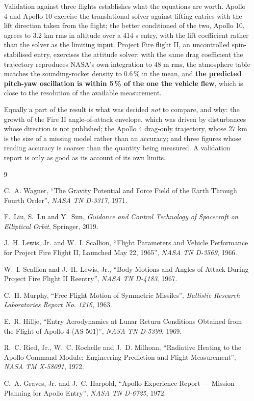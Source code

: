 \documentclass[11pt,a4paper]{article}
\begin{document}
Validation against three flights establishes what the equations are worth. Apollo 4 and
Apollo 10 exercise the translational solver against lifting entries with the lift
direction taken from the flight; the better conditioned of the two, Apollo 10, agrees to
3.2 km rms in altitude over a 414 s entry, with the lift coefficient rather than the
solver as the limiting input. Project Fire flight II, an uncontrolled spin-stabilised
entry, exercises the attitude solver: with the same drag coefficient the trajectory
reproduces NASA's own integration to 48 m rms, the atmosphere table matches the
sounding-rocket density to 0.6\,\% in the mean, and \textbf{the predicted pitch-yaw
oscillation is within 5\,\% of the one the vehicle flew}, which is close to the resolution
of the available measurement.

Equally a part of the result is what was decided \emph{not} to compare, and why: the
growth of the Fire II angle-of-attack envelope, which was driven by disturbances whose
direction is not published; the Apollo 4 drag-only trajectory, whose 27 km is the size of
a missing model rather than an accuracy; and three figures whose reading accuracy is
coarser than the quantity being measured. A validation report is only as good as its
account of its own limits.

\begin{thebibliography}{9}

C.~A. Wagner,
``The Gravity Potential and Force Field of the Earth Through Fourth Order'',
{\em NASA TN D-3317}, 1971.

F.~Liu, S.~Lu and Y.~Sun,
{\em Guidance and Control Technology of Spacecraft on Elliptical Orbit},
Springer, 2019.

J.~H. Lewis, Jr. and W.~I. Scallion,
``Flight Parameters and Vehicle Performance for Project Fire Flight II, Launched
May 22, 1965'',
{\em NASA TN D-3569}, 1966.

W.~I. Scallion and J.~H. Lewis, Jr.,
``Body Motions and Angles of Attack During Project Fire Flight II Reentry'',
{\em NASA TN D-4183}, 1967.

C.~H. Murphy,
``Free Flight Motion of Symmetric Missiles'',
{\em Ballistic Research Laboratories Report No. 1216}, 1963.

E.~R. Hillje,
``Entry Aerodynamics at Lunar Return Conditions Obtained from the Flight of Apollo 4
(AS-501)'',
{\em NASA TN D-5399}, 1969.

R.~C. Ried, Jr., W.~C. Rochelle and J.~D. Milhoan,
``Radiative Heating to the Apollo Command Module: Engineering Prediction and Flight
Measurement'',
{\em NASA TM X-58091}, 1972.

C.~A. Graves, Jr. and J.~C. Harpold,
``Apollo Experience Report --- Mission Planning for Apollo Entry'',
{\em NASA TN D-6725}, 1972.

\end{thebibliography}
\end{document}
